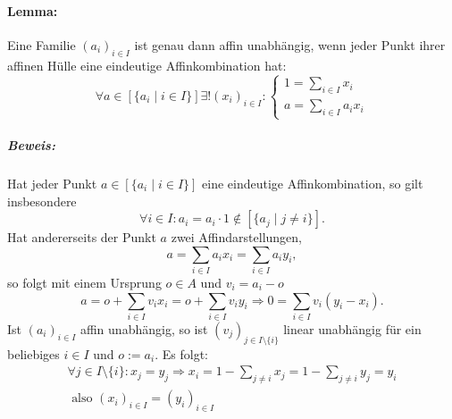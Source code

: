 \paragraph{Lemma: }
	\begin{Lemma}
		Eine Familie $ (a_i)_{i\in I} $ ist genau dann affin unabhängig, wenn jeder Punkt ihrer affinen Hülle eine eindeutige Affinkombination hat:
		\[ \forall a\in [\{a_i\mid i\in I\}]\exists!(x_i)_{i\in I}:
			\begin{cases}
			1 = \sum_{i\in I}x_i\\
			a = \sum_{i\in I}a_ix_i
			\end{cases}\]
	\end{Lemma}
	\subparagraph{Beweis: }
	Hat jeder Punkt $ a\in [\{a_i\mid i\in I\}] $ eine eindeutige Affinkombination, so gilt insbesondere
		\[ \forall i\in I: a_i = a_i\cdot 1 \notin [\{a_j\mid j\neq i\}]. \]
	Hat andererseits der Punkt $ a $ zwei Affindarstellungen,
		\[ a = \sum_{i\in I} a_ix_i = \sum_{i\in I}a_iy_i, \]
	so folgt mit einem Ursprung $ o\in A $ und $ v_i = a_i-o $
		\[ a=o+\sum_{i\in I}v_ix_i=o+\sum_{i\in I}v_iy_i \Rightarrow 0 = \sum_{i\in I}v_i(y_i-x_i). \]
	Ist $ (a_i)_{i\in I} $ affin unabhängig, so ist $ (v_j)_{j\in I\setminus \{i\}} $ linear unabhängig für ein beliebiges $ i\in I $ und $ o:= a_i $. Es folgt:
	\begin{gather*}
        \forall j\in I\setminus \{i\}:x_j=y_j \Rightarrow x_i = 1-\sum_{j\neq i}x_j = 1-\sum_{j\neq i}y_j = y_i 
        \\ \text{ also } (x_{i})_{i \in I} = (y_{i})_{i \in I}
	\end{gather*}
       